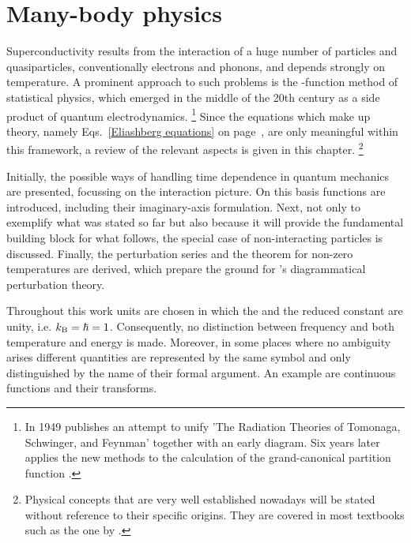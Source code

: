 
\chapter{Many-body physics}

Superconductivity results from the interaction of a huge number of particles and
quasiparticles, conventionally electrons and phonons, and depends strongly on
temperature. A prominent approach to such problems is the -function
method of statistical physics, which emerged in the middle of the 20th century
as a side product of quantum electrodynamics.%
%
\footnote{In 1949  publishes an attempt to unify \q'The Radiation
Theories of Tomonaga, Schwinger, and Feynman' \cite{Dyson49} together with an
early  diagram. Six years later  applies the new
methods to the calculation of the grand-canonical partition function
\cite{Matsubara55}.}
%
Since the equations which make up  theory, namely
Eqs.~\ref{Eliashberg equations} on page~\pageref{Eliashberg equations}, are only
meaningful within this framework, a review of the relevant aspects is given in
this chapter.%
%
\footnote{Physical concepts that are very well established nowadays will be
stated without reference to their specific origins. They are covered in most
textbooks such as the one by  \cite{Mahan}.}

Initially, the possible ways of handling time dependence in quantum mechanics
are presented, focussing on the interaction picture. On this basis 
functions are introduced, including their imaginary-axis formulation. Next, not
only to exemplify what was stated so far but also because it will provide the
fundamental building block for what follows, the special case of non-interacting
particles is discussed. Finally, the perturbation series and the 
theorem for non-zero temperatures are derived, which prepare the ground for
's diagrammatical perturbation theory.

Throughout this work units are chosen in which the  and the
reduced  constant are unity, i.e. $k \sb{\text{B}} = \hbar = 1$.
Consequently, no distinction between frequency and both temperature and energy
is made. Moreover, in some places where no ambiguity arises different quantities
are represented by the same symbol and only distinguished by the name of their
formal argument. An example are continuous functions and their 
transforms.

